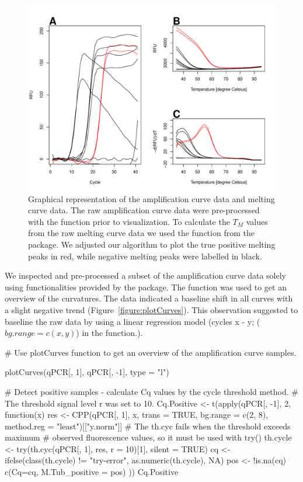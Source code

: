 \begin{figure}[htbp]
  \centering
  \includegraphics[clip=true, width=14cm]{figures/amp_melt.pdf}
  \caption{Graphical representation of the amplification curve data and melting 
curve data.  The raw amplification curve data were pre-processed 
with the  function prior to visualization. To calculate the $T_{M}$ 
values from the raw melting curve data  we used the  
function from the  package.  We adjusted our 
algorithm to plot the true positive melting peaks in red, while negative 
melting 
peaks were labelled in black.} 
\label{figure:amp_melt}
\end{figure}

We inspected and pre-processed a subset of the amplification curve data solely 
using functionalities provided by the  package. The 
 function was used to get an overview of the curvatures. The 
data indicated a baseline shift in all curves with a slight negative trend 
(Figure~\ref{figure:plotCurves}). This observation suggested to baseline the 
raw data by 
using a linear regression model (cycles x - y; ($bg.range = c(x, y)$) in the 
 function.).

\begin{example}
# Use plotCurves function to get an overview of the amplification curve samples.

plotCurves(qPCR[, 1], qPCR[, -1], type = "l")

# Detect positive samples - calculate Cq values by the cycle threshold method. 
# The threshold signal level r was set to 10.
Cq.Positive <- t(apply(qPCR[, -1], 2, function(x)
{
  res <- CPP(qPCR[, 1], x, trans = TRUE, bg.range = c(2, 8),
             method.reg = "least")[["y.norm"]]
  # The th.cyc fails when the threshold exceeds maximum 
  # observed fluorescence values, so it must be used with try()
  th.cycle <- try(th.cyc(qPCR[, 1], res, r = 10)[1], silent = TRUE)
  cq <- ifelse(class(th.cycle) != "try-error", as.numeric(th.cycle), NA)
  pos <- !is.na(cq)
  c(Cq=cq, M.Tub_positive = pos)
}
))
Cq.Positive
\end{example}

